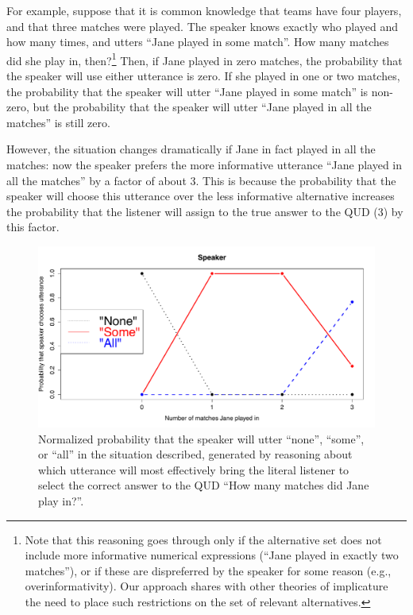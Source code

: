 \documentclass[pdfextras]{handbook}
\begin{document}
For example, suppose that it is common knowledge that teams have four players, and that three matches were played. The speaker knows exactly who played and how many times, and utters ``Jane played in some match''. How many matches did she play in, then?\footnote{Note that this reasoning goes through only if the alternative set does not include more informative numerical expressions (``Jane played in exactly two matches''), or if these are dispreferred by the speaker for some reason (e.g., overinformativity). Our approach shares with other theories of implicature the need to place such restrictions on the set of relevant alternatives.} Then, if Jane played in zero matches, the probability that the speaker will use either utterance is zero. If she played in one or two matches, the probability that the speaker will utter ``Jane played in some match'' is non-zero, but the probability that the speaker will utter ``Jane played in all the matches'' is still zero. 

However, the situation changes dramatically if Jane in fact played in all the matches: now the speaker prefers the more informative utterance ``Jane played in all the matches'' by a factor of about 3. This is because the probability that the speaker will choose this utterance over the less informative alternative increases the probability that the listener will assign to the true answer to the QUD (3) by this factor. 
\begin{figure}[tbh]
\begin{center}
\includegraphics[scale=.3]{S1.pdf}
\end{center}
\label{sprk-SI}
\caption{Normalized probability that the speaker will utter ``none'', ``some'', or ``all'' in the situation described, generated by reasoning about which utterance will most effectively bring the literal listener to select the correct answer to the QUD ``How many matches did Jane play in?''.}
\end{figure}
\end{document}
